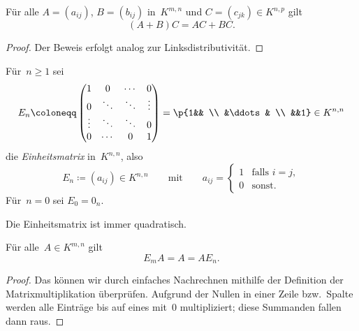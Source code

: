 \documentclass[a4paper]{article}
\begin{document}
\begin{lemma}[Rechtsdistributitvität]\label{lem:matrix:dr}
    Für alle $A = (a_{ij})$, $B = (b_{ij})$ in~$K^{m,n}$ und $C = (c_{jk}) \in K^{n,p}$ gilt
    \begin{equation*}
        (A+B)C = AC+BC.
    \end{equation*}
\end{lemma}

\begin{proof}
    Der Beweis erfolgt analog zur Linksdistributivität.
\end{proof}

\begin{definition}[Einheitsmatrix]
    Für~$n \geq 1$ sei
    \begin{equation*}
        E_n \coloneqq \begin{pmatrix}
            1 & 0 & \cdots & 0 \\
            0 & \ddots & \ddots & \vdots \\
            \vdots & \ddots & \ddots & 0 \\
            0 & \cdots & 0 & 1
        \end{pmatrix}
        = \p{1&& \\ &\ddots& \\ &&1} \in K^{n,n}
    \end{equation*}
    die \emph{Einheitsmatrix} in~$K^{n,n}$, also
    \begin{equation*}
        E_n \coloneqq (a_{ij}) \in K^{n,n} \qquad\text{mit}\qquad a_{ij} =
        \begin{cases}
            1 & \text{falls } i = j, \\
            0 & \text{sonst}.
        \end{cases}
    \end{equation*}
    Für~$n = 0$ sei $E_0 = 0_n$.
\end{definition}

Die Einheitsmatrix ist immer quadratisch.

\begin{lemma}[Einselement]\label{lem:matrix:mn}
    Für alle~$A \in K^{m,n}$ gilt
    \begin{equation*}
        E_mA = A = AE_n.
    \end{equation*}
\end{lemma}

\begin{proof}
    Das können wir durch einfaches Nachrechnen mithilfe der Definition der Matrixmultiplikation überprüfen. Aufgrund der Nullen in einer Zeile bzw.\ Spalte werden alle Einträge bis auf eines mit~$0$ multipliziert; diese Summanden fallen dann raus.
\end{proof}
\end{document}
